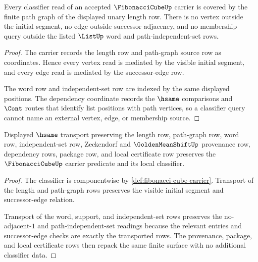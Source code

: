 \begin{theorem}
\label{thm:fibonacci-cube-finite-path-coverage}
Every classifier read of an accepted $\FibonacciCubeUp$ carrier is covered by the finite path graph of the displayed unary length row. There is no vertex outside the initial segment, no edge outside successor adjacency, and no membership query outside the listed $\ListUp$ word and path-independent-set rows.
\end{theorem}
\begin{proof}
The carrier records the length row and path-graph source row as coordinates. Hence every vertex read is mediated by the visible initial segment, and every edge read is mediated by the successor-edge row.

The word row and independent-set row are indexed by the same displayed positions. The dependency coordinate records the $\hsame$ comparisons and $\Cont$ routes that identify list positions with path vertices, so a classifier query cannot name an external vertex, edge, or membership source.
\end{proof}

\begin{theorem}
\label{thm:fibonacci-cube-classifier-transport}
Displayed $\hsame$ transport preserving the length row, path-graph row, word row, independent-set row, Zeckendorf and $\GoldenMeanShiftUp$ provenance row, dependency rows, package row, and local certificate row preserves the $\FibonacciCubeUp$ carrier predicate and its local classifier.
\end{theorem}
\begin{proof}
The classifier is componentwise by \autoref{def:fibonacci-cube-carrier}. Transport of the length and path-graph rows preserves the visible initial segment and successor-edge relation.

Transport of the word, support, and independent-set rows preserves the no-adjacent-$1$ and path-independent-set readings because the relevant entries and successor-edge checks are exactly the transported rows. The provenance, package, and local certificate rows then repack the same finite surface with no additional classifier data.
\end{proof}

